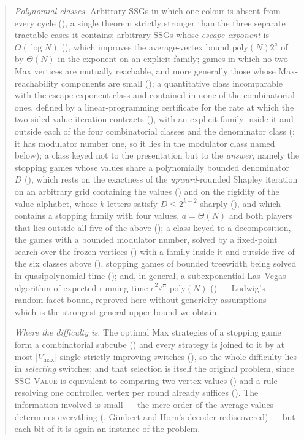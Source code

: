 \documentclass[11pt]{article}
\theoremstyle{plain}
\theoremstyle{definition}
\newcommand{\Vmax}{V_{\max}}
\begin{document}
\begin{abstract}
\emph{Polynomial classes.} Arbitrary SSGs in which one colour is absent
from every cycle (), a single theorem strictly
stronger than the three separate tractable cases it contains; arbitrary
SSGs whose \emph{escape exponent} is $O(\log N)$ (),
which improves the average-vertex bound $\mathrm{poly}(N)2^{a}$ of
 by $\Theta(N)$ in the exponent on an explicit family;
games in which no two Max vertices are mutually reachable, and more
generally those whose Max-reachability components are small
(); a quantitative class incomparable with
the escape-exponent class and contained in none of the combinatorial
ones, defined by a linear-programming certificate for the rate at
which the two-sided value iteration contracts
(), with an explicit family inside it and outside
each of the four combinatorial classes and the denominator class
(; it has modulator number one, so it lies in
the modulator class named below); a class keyed not to
the presentation but to the \emph{answer}, namely the stopping games whose
values share a polynomially bounded denominator $D$
(), which rests on the exactness of the
\emph{upward}-rounded Shapley iteration on an arbitrary grid containing
the values () and on the rigidity of the
value alphabet, whose $k$ letters satisfy $D\le2^{k-2}$ sharply
(), and which contains a
stopping family with four values, $a=\Theta(N)$ and both players that lies
outside all five of the above (); a class keyed to a
decomposition, the games with a bounded modulator number, solved by a
fixed-point search over the frozen vertices () with a
family inside it and outside five of the six classes above
(), stopping games of bounded treewidth
being solved in quasipolynomial time (); and, in general, a subexponential
Las~Vegas algorithm of expected running time
$e^{2\sqrt n}\,\mathrm{poly}(N)$ () --- Ludwig's
random-facet bound, reproved here without genericity assumptions --- which
is the strongest general upper bound we obtain.

\emph{Where the difficulty is.} The optimal Max strategies of a stopping
game form a combinatorial subcube () and every
strategy is joined to it by at most $|\Vmax|$ single strictly improving
switches (), so the whole difficulty lies in
\emph{selecting} switches; and that selection is itself the original
problem, since \textsc{SSG-Value} is equivalent to comparing two vertex
values () and a rule resolving one
controlled vertex per round already suffices
(). The information involved is small --- the
mere order of the average values determines everything
(, Gimbert and Horn's decoder rediscovered) --- but each bit of it is again an instance
of the problem.


\end{abstract}
\end{document}
